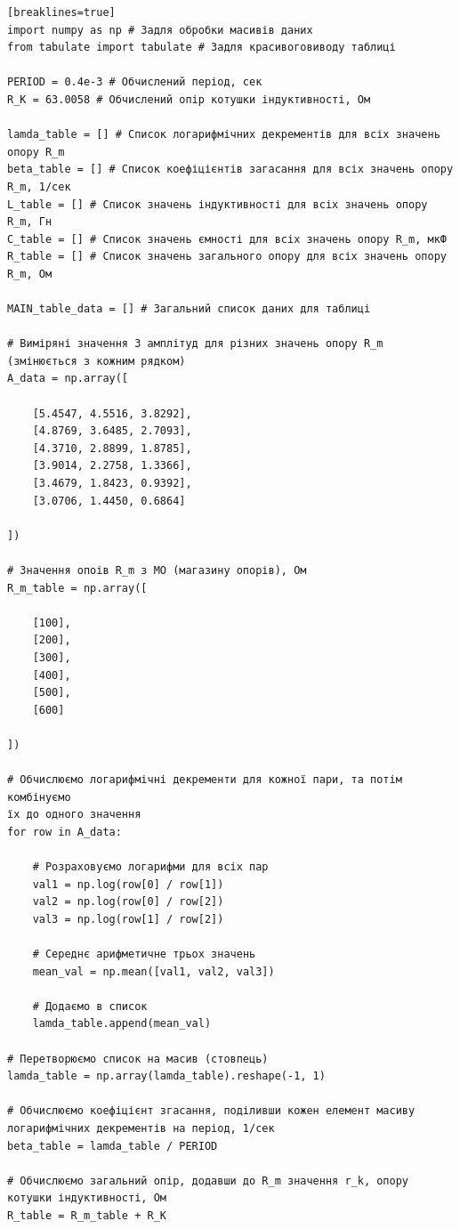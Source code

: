 \documentclass[12pt,a4paper]{article}
\begin{document}
    \small{

    \begin{verbatim}[breaklines=true]
import numpy as np # Задля обробки масивів даних
from tabulate import tabulate # Задля красивоговиводу таблиці

PERIOD = 0.4e-3 # Обчислений період, сек
R_K = 63.0058 # Обчислений опір котушки індуктивності, Ом

lamda_table = [] # Список логарифмічних декрементів для всіх значень опору R_m
beta_table = [] # Список коефіцієнтів загасання для всіх значень опору R_m, 1/сек
L_table = [] # Список значень індуктивності для всіх значень опору R_m, Гн
C_table = [] # Список значень ємності для всіх значень опору R_m, мкФ
R_table = [] # Список значень загального опору для всіх значень опору R_m, Ом

MAIN_table_data = [] # Загальний список даних для таблиці

# Виміряні значення 3 амплітуд для різних значень опору R_m (змінюється з кожним рядком)
A_data = np.array([

    [5.4547, 4.5516, 3.8292],
    [4.8769, 3.6485, 2.7093],
    [4.3710, 2.8899, 1.8785],
    [3.9014, 2.2758, 1.3366],
    [3.4679, 1.8423, 0.9392],
    [3.0706, 1.4450, 0.6864]

])

# Значення опоів R_m з МО (магазину опорів), Ом
R_m_table = np.array([

    [100],
    [200],
    [300],
    [400],
    [500],
    [600]

])

# Обчислюємо логарифмічні декременти для кожної пари, та потім комбінуємо
їх до одного значення
for row in A_data:

    # Розраховуємо логарифми для всіх пар
    val1 = np.log(row[0] / row[1])
    val2 = np.log(row[0] / row[2])
    val3 = np.log(row[1] / row[2])

    # Середнє арифметичне трьох значень
    mean_val = np.mean([val1, val2, val3])

    # Додаємо в список
    lamda_table.append(mean_val)

# Перетворюємо список на масив (стовпець)
lamda_table = np.array(lamda_table).reshape(-1, 1)

# Обчислюємо коефіцієнт згасання, поділивши кожен елемент масиву
логарифмічних декрементів на період, 1/сек
beta_table = lamda_table / PERIOD

# Обчислюємо загальний опір, додавши до R_m значення r_k, опору котушки індуктивності, Ом
R_table = R_m_table + R_K


\end{verbatim}}
\end{document}
